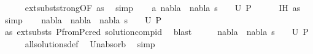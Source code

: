 \begin{isabellebody}
\ \ \ \ \isamarkupfalse%
\ ext{\isacharunderscore}{\kern0pt}subst{\isacharunderscore}{\kern0pt}strong{\isacharbrackleft}{\kern0pt}OF\ as{\isacharparenleft}{\kern0pt}{}{\isacharparenright}{\kern0pt}{\isacharbrackright}{\kern0pt}\ \isamarkupfalse%
\ simp{\isacharplus}{\kern0pt}\isanewline
\ \ \isamarkupfalse%
\ a{\isacharcolon}{\kern0pt}\ {\isachardoublequoteopen}{\isacharparenleft}{\kern0pt}nabla{}\ {\isasymunion}\ nabla{}{\isacharcomma}{\kern0pt}\ s{}\ {\isasymbullet}\ {\isacharbrackleft}{\kern0pt}{\isacharbrackright}{\kern0pt}{\isacharparenright}{\kern0pt}\ {\isasymin}\ U\ P{}{\isachardoublequoteclose}\isanewline
\ \ \ \ \isamarkupfalse%
\ IH\ as{\isacharparenleft}{\kern0pt}{}{\isacharparenright}{\kern0pt}\ \isamarkupfalse%
\ simp\isanewline
\ \ \isamarkupfalse%
\ {\isachardoublequoteopen}{\isacharparenleft}{\kern0pt}nabla{}\ {\isasymunion}\ nabla{}\ {\isasymunion}\ nabla{}{\isacharcomma}{\kern0pt}\ s{}\ {\isasymbullet}\ {\isacharbrackleft}{\kern0pt}{\isacharbrackright}{\kern0pt}{\isacharparenright}{\kern0pt}\ {\isasymin}\ U\ P{}{\isachardoublequoteclose}\isanewline
\ \ \ \ \isamarkupfalse%
\ as{\isacharparenleft}{\kern0pt}{}{\isacharparenright}{\kern0pt}\ ext{\isacharunderscore}{\kern0pt}substs{\isacharparenleft}{\kern0pt}{}{\isacharparenright}{\kern0pt}\ P{}{\isacharunderscore}{\kern0pt}from{\isacharunderscore}{\kern0pt}P{}{\isacharunderscore}{\kern0pt}cred\ solution{\isacharunderscore}{\kern0pt}comp{\isacharunderscore}{\kern0pt}id\ \isamarkupfalse%
\ blast\isanewline
\ \ \isamarkupfalse%
\ \isamarkupfalse%
\ {\isachardoublequoteopen}{\isacharparenleft}{\kern0pt}nabla{}\ {\isasymunion}\ nabla{}{\isacharcomma}{\kern0pt}\ s{}\ {\isasymbullet}\ {\isacharbrackleft}{\kern0pt}{\isacharbrackright}{\kern0pt}{\isacharparenright}{\kern0pt}\ {\isasymin}\ U\ P{}{\isachardoublequoteclose}\isanewline
\ \ \ \ \isamarkupfalse%
\ all{\isacharunderscore}{\kern0pt}solutions{\isacharunderscore}{\kern0pt}def\ \isamarkupfalse%
\ Un{\isacharunderscore}{\kern0pt}absorb\ \isamarkupfalse%
\ simp\isanewline
{}\isamarkupfalse%
%
\endisatagproof
{\isafoldproof}%
%
\isadelimproof
\isanewline
%
\endisadelimproof
\isanewline

\end{isabellebody}
